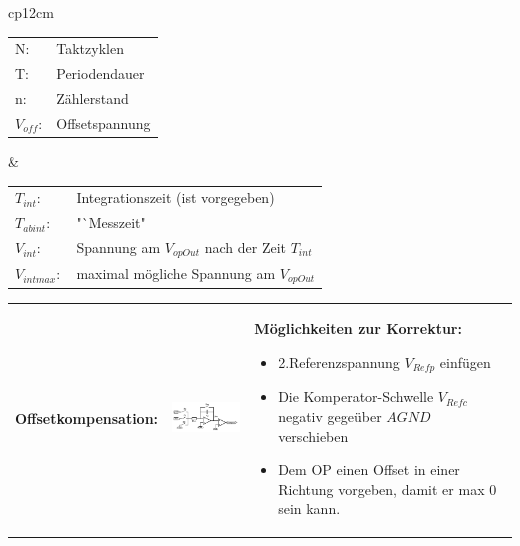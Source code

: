	\pagebreak  
  \begin{longtable}{cp{12cm}}
 
  \begin{tabular}{ll}
    N:&Taktzyklen\\
    T:&Periodendauer\\
    n:&Zählerstand\\
    $V_{off}$:&Offsetspannung\\
  \end{tabular} &
  
  \begin{tabular}{ll}
    $T_{int}$:&Integrationszeit (ist vorgegeben)\\
    $T_{abint}$:& "`Messzeit"\\
    $V_{int}$:&Spannung am $V_{opOut}$ nach der Zeit $T_{int}$\\
    $V_{intmax}:$&maximal mögliche Spannung am $V_{opOut}$\\
  \end{tabular}
\end{longtable}

\begin{longtable}{p{4cm}p{6cm}p{8cm}}
  \textbf{Offsetkompensation:} &
  \includegraphics[width=6cm, valign=t]{pictures/offsetkompensation} &
  \textbf{Möglichkeiten zur Korrektur:}
  \begin{itemize}
    \item 2.Referenzspannung $V_{Refp}$ einfügen
    \item Die Komperator-Schwelle $V_{Refc}$ negativ gegeüber $AGND$ verschieben
    \item Dem OP einen Offset in einer Richtung vorgeben, damit er max 0 sein kann.
  \end{itemize}
\end{longtable}

